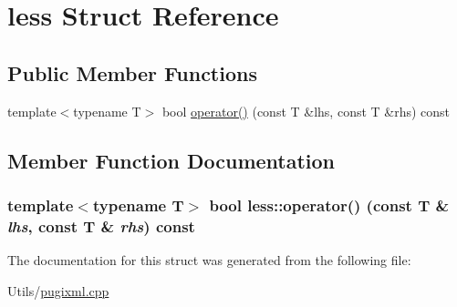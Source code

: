 \hypertarget{structless}{
\section{less Struct Reference}
\label{structless}
}
\subsection*{Public Member Functions}
\begin{CompactItemize}
\item 
template$<$typename T$>$ bool \hyperlink{structless_0c27ef55a1c5a352989dff9c82a68da0}{operator()} (const T \&lhs, const T \&rhs) const 
\end{CompactItemize}


\subsection{Member Function Documentation}
\hypertarget{structless_0c27ef55a1c5a352989dff9c82a68da0}{
\subsubsection[operator()]{\setlength{\rightskip}{0pt plus 5cm}template$<$typename T$>$ bool less::operator() (const T \& {\em lhs}, const T \& {\em rhs}) const}}
\label{structless_0c27ef55a1c5a352989dff9c82a68da0}




The documentation for this struct was generated from the following file:\begin{CompactItemize}
\item 
Utils/\hyperlink{pugixml_8cpp}{pugixml.cpp}\end{CompactItemize}
